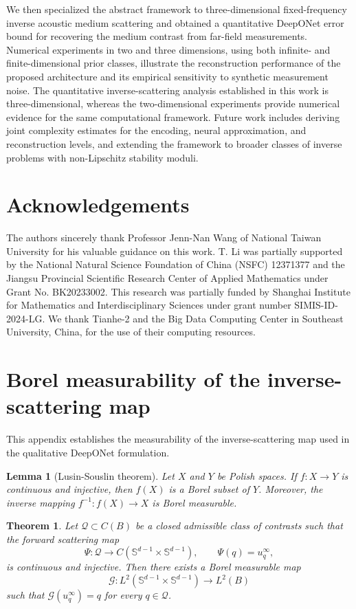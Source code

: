 \documentclass{article}
\numberwithin{equation}{section}
\theoremstyle{plain}
\newtheorem{theorem}{Theorem}[section]
\newtheorem{lemma}{Lemma}[section]
\begin{document}
We then specialized the abstract framework to three-dimensional fixed-frequency inverse acoustic medium scattering and obtained a quantitative DeepONet error bound for recovering the medium contrast from far-field measurements. Numerical experiments in two and three dimensions, using both infinite- and finite-dimensional prior classes, illustrate the reconstruction performance of the proposed architecture and its empirical sensitivity to synthetic measurement noise. The quantitative inverse-scattering analysis established in this work is three-dimensional, whereas the two-dimensional experiments provide numerical evidence for the same computational framework. Future work includes deriving joint complexity estimates for the encoding, neural approximation, and reconstruction levels, and extending the framework to broader classes of inverse problems with non-Lipschitz stability moduli.

\section*{Acknowledgements}
The authors sincerely thank Professor Jenn-Nan Wang of National Taiwan University for his valuable guidance on this work. T. Li was partially supported by the National Natural Science Foundation of China (NSFC) 12371377 and the Jiangsu Provincial Scientific Research Center of Applied Mathematics under Grant No. BK20233002. This research was partially funded by Shanghai Institute for Mathematics and Interdisciplinary Sciences under grant number SIMIS-ID-2024-LG. We thank Tianhe-2 and the Big Data Computing Center in Southeast University, China, for the use of their computing resources.

\appendix

	\section{Borel measurability of the inverse-scattering map}
	This appendix establishes the measurability of the inverse-scattering map used in the qualitative DeepONet formulation.
	\begin{lemma}[Lusin-Souslin theorem]
		Let $X$ and $Y$ be Polish spaces. If $f: X \to Y$ is continuous and injective, then $f(X)$ is a Borel subset of $Y$. Moreover, the inverse mapping $f^{-1}: f(X) \to X$ is Borel measurable.
	\end{lemma}
	
	\begin{theorem}\label{borel-measurability}
		Let $\mathcal Q\subset C(B)$ be a closed admissible class of contrasts such that the forward scattering map
		\[
			\Psi:\mathcal Q\to C(\mathbb S^{d-1}\times\mathbb S^{d-1}),
			\qquad \Psi(q)=u_q^\infty,
		\]
		is continuous and injective. Then there exists a Borel measurable map
		\[
			\mathscr{G}:L^2(\mathbb{S}^{d-1}\times\mathbb{S}^{d-1})\to L^2(B)
		\]
		such that $\mathscr{G}(u_q^\infty)=q$ for every $q\in\mathcal Q$.
	\end{theorem}
	
\end{document}
